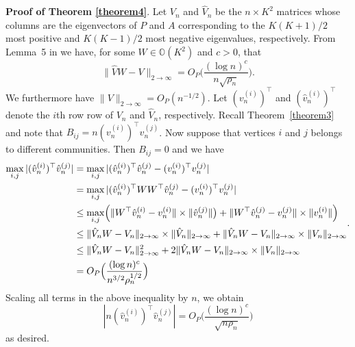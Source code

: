 \documentclass[12pt]{article}
\begin{document}
\textbf{Proof of Theorem \ref{theorem4}}. Let \(V_n\) and \(\hat{V}_n\)
be the $n \times K^2$ matrices whose columns are the eigenvectors of \(P\) and \(A\) corresponding to the
\(K (K + 1) / 2\) most positive and \(K (K - 1) / 2\) most negative
eigenvalues, respectively. From Lemma~5 in
\citeauthor{rubindelanchy2017statistical} we have, for some
\(W \in \mathbb{O}(K^2)\) and \(c > 0\), that
$$\|\hat{V} W - V\|_{2 \to \infty} = O_P \big(\frac{(\log n)^c}{n \sqrt{\rho_n}} \big).$$
We furthermore have \(\|V\|_{2 \to \infty} = O_P(n^{-1/2})\). Let
\((v_n^{(i)})^\top\) and \((\hat{v}_n^{(i)})^\top\) denote the $i$th row
row of \(V_n\) and \(\hat{V}_n\), respectively. Recall
Theorem~\ref{theorem3} and note that $B_{ij} = n(v_n^{(i)})^{\top}
v_n^{(j)}$. Now suppose that vertices $i$ and $j$ belongs to different
communities. Then $B_{ij} = 0$ and we have
\[\begin{split}
\max_{i, j} |(\hat{v}_n^{(i)})^\top \hat{v}_n^{(j)}| &
= \max_{i, j} |(\hat{v}_n^{(i)})^\top \hat{v}_n^{(j)} - 
(v_n^{(i)})^\top v_n^{(j)}| \\
& = \max_{i, j} |(\hat{v}_n^{(i)})^\top W W^\top \hat{v}_n^{(j)} -
(v_n^{(i)})^\top v_n^{(j)}| \\
& \leq \max_{i,j} \Bigl(\|W^{\top} \hat{v}_n^{(i)} - v_n^{(i)}\| \times \|\hat{v}_n^{(j)}\|\bigr)
+ \|W^{\top} \hat{v}_n^{(j)} - v_n^{(j)}\| \times \|v_n^{(i)}\|\Bigr) \\
&\leq \|\hat{V}_n W - V_n\|_{2 \to \infty} \times \|\hat{V}_n\|_{2 \to \infty} +
\|\hat{V}_n W - V_n\|_{2 \to \infty} \times \|V_n\|_{2 \to \infty} \\
& \leq \|\hat{V}_n W - V_n\|_{2 \to \infty}^2 + 2 \|\hat{V}_n W -
V_n\|_{2 \to \infty} \times \|V_n\|_{2 \to \infty}
\\
& = O_P \Big( \frac{(\log n)^c}{n^{3/2} \rho_n^{1/2}} \Big)
\end{split}.\]
Scaling all terms in the above inequality by \(n\), we obtain
$$|n (\hat{v}_n^{(i)})^\top \hat{v}_n^{(j)}| = O_P \Big( \frac{(\log n)^c}{\sqrt{n \rho_n}} \Big)$$
as desired.
\end{document}
